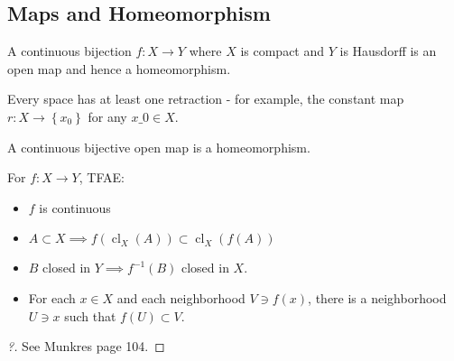 \hypertarget{maps-and-homeomorphism}{%
\subsection{Maps and Homeomorphism}\label{maps-and-homeomorphism}}

\begin{theorem}

A continuous bijection \(f: X\to Y\) where \(X\) is compact and \(Y\) is
Hausdorff is an open map and hence a homeomorphism.

\end{theorem}

\begin{remark}[On retractions]

Every space has at least one retraction - for example, the constant map
\(r:X \to\left\{{x_0}\right\}\) for any \(x\_0 \in X\).

\end{remark}

\begin{theorem}

A continuous bijective open map is a homeomorphism.

\end{theorem}

\begin{theorem}

For \(f:X\to Y\), TFAE:

\begin{itemize}
\tightlist
\item
  \(f\) is continuous
\item
  \(A\subset X \implies f(\operatorname{cl}_X(A)) \subset \operatorname{cl}_X(f(A))\)
\item
  \(B\) closed in \(Y \implies f^{-1}(B)\) closed in \(X\).
\item
  For each \(x\in X\) and each neighborhood \(V \ni f(x)\), there is a
  neighborhood \(U\ni x\) such that \(f(U) \subset V\).
\end{itemize}

\end{theorem}

\begin{proof}[?]

See Munkres page 104.

\end{proof}

